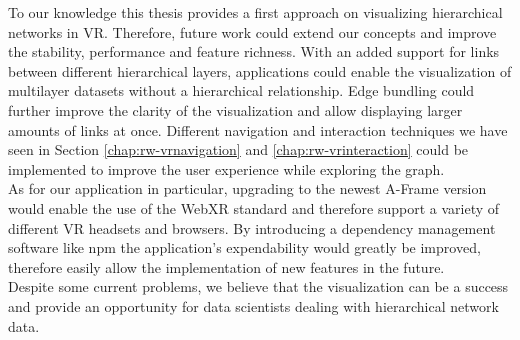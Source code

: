 To our knowledge this thesis provides a first approach on visualizing hierarchical networks in VR. Therefore, future work could extend our concepts and improve the stability, performance and feature richness.
With an added support for links between different hierarchical layers, applications could enable the visualization of multilayer datasets without a hierarchical relationship. Edge bundling could further improve the clarity of the visualization and allow displaying larger amounts of links at once. Different navigation and interaction techniques we have seen in Section \ref{chap:rw-vrnavigation} and \ref{chap:rw-vrinteraction} could be implemented to improve the user experience while exploring the graph.\
\\
As for our application in particular, upgrading to the newest A-Frame version would enable the use of the WebXR standard and therefore support a variety of different VR headsets and browsers. By introducing a dependency management software like npm the application's expendability would greatly be improved, therefore easily allow the implementation of new features in the future.
\\
Despite some current problems, we believe that the visualization can be a success and provide an opportunity for data scientists dealing with hierarchical network data.